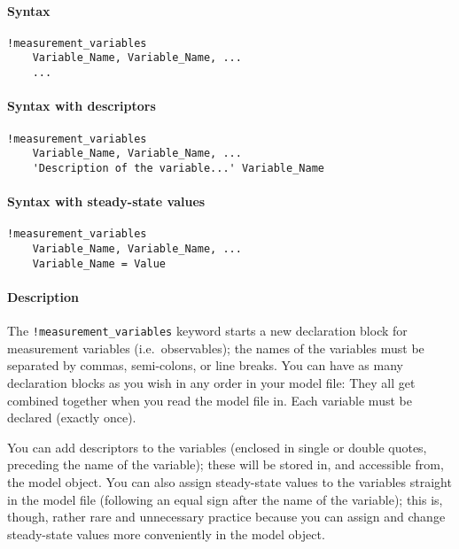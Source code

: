 


	\paragraph{Syntax}\label{syntax}

\begin{verbatim}
!measurement_variables
    Variable_Name, Variable_Name, ...
    ...
\end{verbatim}

\paragraph{Syntax with descriptors}\label{syntax-with-descriptors}

\begin{verbatim}
!measurement_variables
    Variable_Name, Variable_Name, ...
    'Description of the variable...' Variable_Name
\end{verbatim}

\paragraph{Syntax with steady-state
values}\label{syntax-with-steady-state-values}

\begin{verbatim}
!measurement_variables
    Variable_Name, Variable_Name, ...
    Variable_Name = Value
\end{verbatim}

\paragraph{Description}\label{description}

The \texttt{!measurement\_variables} keyword starts a new declaration
block for measurement variables (i.e.~observables); the names of the
variables must be separated by commas, semi-colons, or line breaks. You
can have as many declaration blocks as you wish in any order in your
model file: They all get combined together when you read the model file
in. Each variable must be declared (exactly once).

You can add descriptors to the variables (enclosed in single or double
quotes, preceding the name of the variable); these will be stored in,
and accessible from, the model object. You can also assign steady-state
values to the variables straight in the model file (following an equal
sign after the name of the variable); this is, though, rather rare and
unnecessary practice because you can assign and change steady-state
values more conveniently in the model object.

